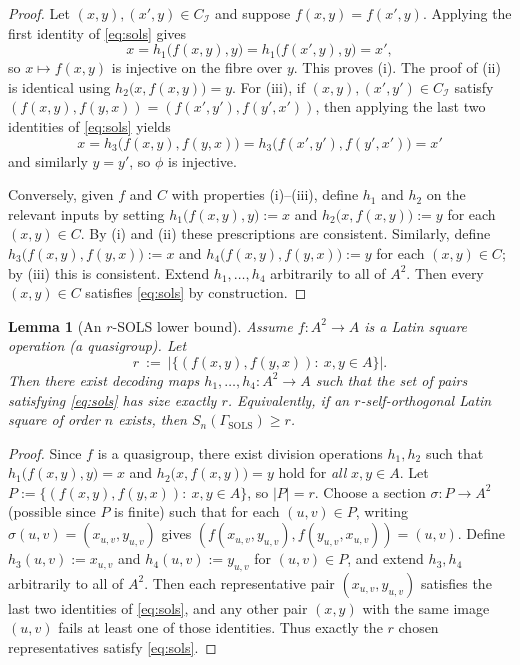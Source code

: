 \documentclass[11pt]{article}
\theoremstyle{plain}
\newtheorem{lemma}[theorem]{Lemma}
\theoremstyle{definition}
\theoremstyle{definition}
\theoremstyle{remark}
\newcommand{\A}{A}
\newcommand{\Sn}{S_n}
\newcommand{\abs}[1]{\left\lvert #1 \right\rvert}
\begin{document}
\begin{proof}
Let $(x,y),(x',y)\in C_{\mathcal I}$ and suppose $f(x,y)=f(x',y)$. Applying the first identity of
\eqref{eq:sols} gives
\[
  x=h_1\bigl(f(x,y),y\bigr)=h_1\bigl(f(x',y),y\bigr)=x',
\]
so $x\mapsto f(x,y)$ is injective on the fibre over $y$. This proves (i). The proof of (ii) is identical using
$h_2\bigl(x,f(x,y)\bigr)=y$.
For (iii), if $(x,y),(x',y')\in C_{\mathcal I}$ satisfy
$(f(x,y),f(y,x))=(f(x',y'),f(y',x'))$, then applying the last two identities of \eqref{eq:sols} yields
\[
  x=h_3\bigl(f(x,y),f(y,x)\bigr)=h_3\bigl(f(x',y'),f(y',x')\bigr)=x'
\]
and similarly $y=y'$, so $\phi$ is injective.

Conversely, given $f$ and $C$ with properties (i)--(iii), define $h_1$ and $h_2$ on the relevant inputs by
setting $h_1\bigl(f(x,y),y\bigr):=x$ and $h_2\bigl(x,f(x,y)\bigr):=y$ for each $(x,y)\in C$.
By (i) and (ii) these prescriptions are consistent.
Similarly, define $h_3\bigl(f(x,y),f(y,x)\bigr):=x$ and $h_4\bigl(f(x,y),f(y,x)\bigr):=y$ for each $(x,y)\in C$;
by (iii) this is consistent.
Extend $h_1,\dots,h_4$ arbitrarily to all of $\A^2$.
Then every $(x,y)\in C$ satisfies \eqref{eq:sols} by construction.
\end{proof}

\begin{lemma}[An $r$-SOLS lower bound]
\label{lem:sols-rsols}
Assume $f:\A^2\to\A$ is a Latin square operation (a quasigroup).
Let
\[
  r\ :=\ \abs{\bigl\{(f(x,y),f(y,x)):\ x,y\in\A\bigr\}}.
\]
Then there exist decoding maps $h_1,\dots,h_4:\A^2\to\A$ such that the set of pairs satisfying \eqref{eq:sols}
has size exactly $r$.
Equivalently, if an $r$-self-orthogonal Latin square of order $n$ exists, then
\(\Sn(\Gamma_{\mathrm{SOLS}})\ge r\).
\end{lemma}

\begin{proof}
Since $f$ is a quasigroup, there exist division operations $h_1,h_2$ such that
$h_1\bigl(f(x,y),y\bigr)=x$ and $h_2\bigl(x,f(x,y)\bigr)=y$ hold for \emph{all} $x,y\in\A$.
Let
\(P:=\{(f(x,y),f(y,x)):\ x,y\in\A\}\), so $\abs{P}=r$.
Choose a section $\sigma:P\to\A^2$ (possible since $P$ is finite) such that for each $(u,v)\in P$,
writing $\sigma(u,v)=(x_{u,v},y_{u,v})$ gives
\((f(x_{u,v},y_{u,v}),f(y_{u,v},x_{u,v}))=(u,v)\).
Define $h_3(u,v):=x_{u,v}$ and $h_4(u,v):=y_{u,v}$ for $(u,v)\in P$, and extend $h_3,h_4$ arbitrarily to all of
$\A^2$.
Then each representative pair $(x_{u,v},y_{u,v})$ satisfies the last two identities of \eqref{eq:sols}, and any
other pair $(x,y)$ with the same image $(u,v)$ fails at least one of those identities.
Thus exactly the $r$ chosen representatives satisfy \eqref{eq:sols}.
\end{proof}
\end{document}
